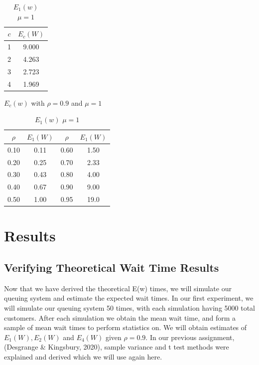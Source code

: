\documentclass{article}
\begin{document}
    \begin{table}[h!]
        \parbox{.48\linewidth}{
        \centering
        \begin{tabular}{|c | c |}
            \hline
            $c$ & $E_c(W)$ \\
            \hline\hline
            1 & 9.000 \\
            2 & 4.263 \\
            3 & 2.723\\
            4 & 1.969 \\
            \hline
        \end{tabular}
        \caption{$E_c(w)$ with $\rho = 0.9$ and $\mu = 1$}
        \label{Table:ew_by_number_servers_theoretical_results}
        }
        \parbox{.48\linewidth}{
        \centering
        \begin{tabular}{|c | c || c | c |}
            \hline
            $\rho$ & $E_1(W)$ & $\rho$ & $E_1(W)$ \\
            \hline\hline
            0.10 & 0.11 & 0.60 & 1.50\\
            0.20 & 0.25 & 0.70 & 2.33 \\
            0.30 & 0.43 & 0.80 & 4.00 \\
            0.40 & 0.67 & 0.90 & 9.00 \\
            0.50 & 1.00 & 0.95 & 19.0 \\
            \hline
        \end{tabular}
        \caption{$E_1(w)$ $\mu = 1$}
        \label{Table:ew_by_rho_single_server_theoretical_results}
        }
    \end{table}

    \newpage

    \section{Results}
    \subsection*{Verifying Theoretical Wait Time Results}

    Now that we have derived the theoretical E(w) times, we will simulate our queuing system and estimate the expected wait times. In our first experiment, we will simulate our queuing system 50 times, with each simulation having 5000 total customers. After each simulation we obtain the mean wait time, and form a sample of mean wait times to perform statistics on. We will obtain estimates of $E_1(W), E_2(W)$ and $E_4(W)$ given $\rho = 0.9$. In our previous assignment, (Desgrange \& Kingsbury, 2020), sample variance and t test methods were explained and derived which we will use again here.
\end{document}
